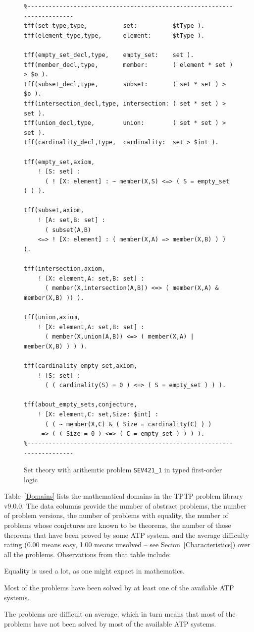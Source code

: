 \documentclass[runningheads]{llncs}
\newenvironment{packed_itemize}{
\vspace*{-0.2em}
\begin{itemize}
\setlength{\partopsep}{0pt}
\setlength{\itemsep}{1pt}
\setlength{\parskip}{0pt}
\setlength{\parsep}{0pt}
}{\end{itemize}}
\begin{document}
\begin{figure}[htb]
\centering
{\footnotesize
{\setlength{\baselineskip}{3mm}
\begin{verbatim}
%------------------------------------------------------------------------
tff(set_type,type,          set:          $tType ).
tff(element_type,type,      element:      $tType ).

tff(empty_set_decl,type,    empty_set:    set ).
tff(member_decl,type,       member:       ( element * set ) > $o ).
tff(subset_decl,type,       subset:       ( set * set ) > $o ).
tff(intersection_decl,type, intersection: ( set * set ) > set ).
tff(union_decl,type,        union:        ( set * set ) > set ).
tff(cardinality_decl,type,  cardinality:  set > $int ).

tff(empty_set,axiom,
    ! [S: set] :
      ( ! [X: element] : ~ member(X,S) <=> ( S = empty_set ) ) ).

tff(subset,axiom,
    ! [A: set,B: set] :
      ( subset(A,B)
    <=> ! [X: element] : ( member(X,A) => member(X,B) ) ) ).

tff(intersection,axiom,
    ! [X: element,A: set,B: set] :
      ( member(X,intersection(A,B)) <=> ( member(X,A) & member(X,B) )) ).

tff(union,axiom,
    ! [X: element,A: set,B: set] :
      ( member(X,union(A,B)) <=> ( member(X,A) | member(X,B) ) ) ).

tff(cardinality_empty_set,axiom,
    ! [S: set] :
      ( ( cardinality(S) = 0 ) <=> ( S = empty_set ) ) ).

tff(about_empty_sets,conjecture,
    ! [X: element,C: set,Size: $int] :
      ( ( ~ member(X,C) & ( Size = cardinality(C) ) )
     => ( ( Size = 0 ) <=> ( C = empty_set ) ) ) ).
%------------------------------------------------------------------------
\end{verbatim}
}}
\caption{Set theory with arithemtic problem {\tt SEV421\_1} in typed first-order logic}
\label{ExampleTF0}
\end{figure}

Table~\ref{Domains} lists the mathematical domains in the TPTP problem library v9.0.0.
The data columns provide the number of abstract problems, the number of problem versions, the
number of problems with equality, the number of problems whose conjctures are known to be
theorems, the number of those theorems that have been proved by some ATP system, and the average 
difficulty rating (0.00 means easy, 1.00 means unsolved -- see Secion~\ref{Characteristics}) over 
all the problems.
Observations from that table include:
\begin{packed_itemize}
\item Equality is used a lot, as one might expact in mathematics.
\item Most of the problems have been solved by at least one of the available ATP systems.
\item The problems are difficult on average, which in turn means that most of the problems have
      not been solved by most of the available ATP systems.
\end{packed_itemize}
\end{document}
